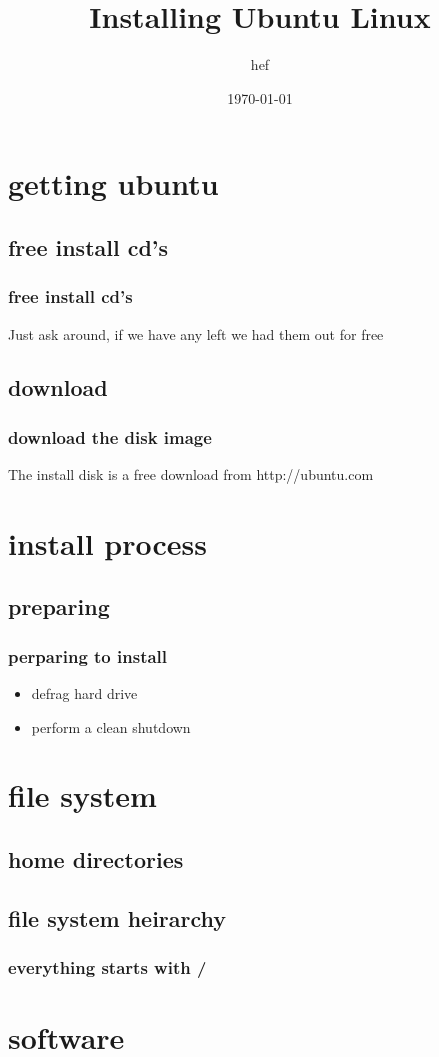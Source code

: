 \documentclass[hyperref={pdfpagelabels=false}]{beamer}
\title{Installing Ubuntu Linux}
\author{hef}
\date{\today}
\begin{document}
\frame{\titlepage}
\section[outline]{}
\frame{\tableofcontents}
\section{getting ubuntu}
\subsection{free install cd's}
\frame
{
    \frametitle{free install cd's}
    Just ask around, if we have any left we had them out for free
}
\subsection{download}
\frame
{
    \frametitle{download the disk image}
    The install disk is a free download from http://ubuntu.com
}
\section{install process}
\subsection{preparing}
\frame
{
    \frametitle{perparing to install}
    \begin{itemize}
    \item{defrag hard drive}
    \item{perform a clean shutdown}
    \end{itemize}
}
\section{file system}
\subsection{home directories}
\subsection{file system heirarchy}
\frame
{
    \frametitle{everything starts with /}
    
}
\section{software}
\end{document}
